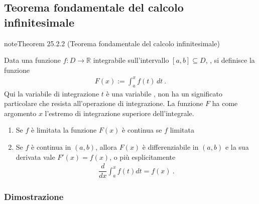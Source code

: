 \documentclass[letterpaper,10pt,italian]{jupyterBook}
\begin{document}
\subsection{Teorema fondamentale del calcolo infinitesimale}
\label{\detokenize{ch/infinitesimal_calculus/integrals:teorema-fondamentale-del-calcolo-infinitesimale}}\label{\detokenize{ch/infinitesimal_calculus/integrals:infinitesimal-calculus-integrals-thm-fund}}\label{ch/infinitesimal_calculus/integrals:integrals:thm:fund}
\begin{sphinxadmonition}{note}{Theorem 25.2.2 (Teorema fondamentale del calcolo infinitesimale)}



\sphinxAtStartPar
Data una funzione \(f: D \rightarrow \mathbb{R}\) integrabile sull’intervallo \([a,b] \subseteq D\), {\hyperref[\detokenize{ch/infinitesimal_calculus/integrals:infinitesimal-calculus:integrals:def:integrable-function}]{}}, si definisce la funzione
\begin{equation*}
\begin{split}F(x) := \int_{a}^{x} f(t) \, dt \ .\end{split}
\end{equation*}
\sphinxAtStartPar
{} Qui la variabile di integrazione \(t\) è una variabile , non ha un significato particolare che resista all’operazione di integrazione. La funzione \(F\) ha come argomento \(x\) l’estremo di integrazione superiore dell’integrale.
\begin{enumerate}
%
\item {} 
\sphinxAtStartPar
Se \(f\) è limitata la funzione \(F(x)\) è continua se \(f\) limitata

\item {} 
\sphinxAtStartPar
Se \(f\) è continua in \((a,b)\), allora \(F(x)\) è differenziabile in \((a,b)\) e la sua derivata vale \(F'(x) = f(x)\), o più esplicitamente
\begin{equation*}
\begin{split}\dfrac{d}{dx} \int_{a}^{x} f(t) dt = f(x) \ .\end{split}
\end{equation*}
\end{enumerate}
\end{sphinxadmonition}
\subsubsection*{Dimostrazione}
\end{document}
